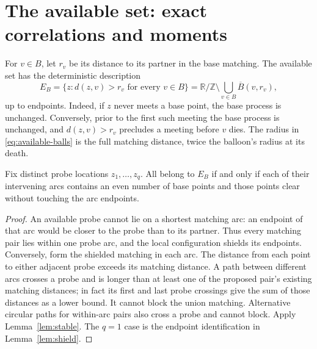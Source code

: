 \documentclass[11pt,letterpaper]{article}
\newcommand{\T}{\mathbb R/\mathbb Z}\newcommand{\Leb}{\operatorname{Leb}}
\begin{document}
\section{The available set: exact correlations and moments}\label{sec:available}

For $v\in B$, let $r_v$ be its distance to its partner in the base matching.
The available set has the deterministic description
\begin{equation}\label{eq:available-balls}
 E_B=\{z:d(z,v)>r_v\text{ for every }v\in B\}
 =\T\setminus\bigcup_{v\in B}\overline B(v,r_v),
\end{equation}
up to endpoints. Indeed, if $z$ never meets a base point, the base process
is unchanged. Conversely, prior to the first such meeting the base process
is unchanged, and $d(z,v)>r_v$ precludes a meeting before $v$ dies.
The radius in \eqref{eq:available-balls} is the full matching distance,
twice the balloon's radius at its death.

\begin{lemma}\label{lem:probes}
Fix distinct probe locations $z_1,\ldots,z_q$. All belong to $E_B$ if and
only if each of their intervening arcs contains an even number of base
points and those points clear without touching the arc endpoints.
\end{lemma}
\begin{proof}
An available probe cannot lie on a shortest matching arc: an endpoint of
that arc would be closer to the probe than to its partner. Thus every
matching pair lies within one probe arc, and the local configuration shields
its endpoints. Conversely, form the shielded matching in each arc. The
distance from each point to either adjacent probe exceeds its matching
distance. A path between different arcs crosses a probe and is longer
than at least one of the proposed pair's existing matching distances; in
fact its first and last probe crossings give the sum of those distances
as a lower bound. It cannot block the union matching. Alternative circular
paths for within-arc pairs also cross a probe and cannot block. Apply
Lemma~\ref{lem:stable}. The $q=1$ case is the endpoint identification in
Lemma~\ref{lem:shield}.
\end{proof}
\end{document}
